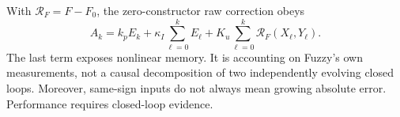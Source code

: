 With $\mathcal R_F=F-F_0$, the zero-constructor raw correction obeys
\begin{equation}
 A_k=k_pE_k+\kappa_I\sum_{\ell=0}^kE_\ell
               +K_u\sum_{\ell=0}^k\mathcal R_F(X_\ell,Y_\ell).
 \label{eq:fpd_accounting}
\end{equation}
The last term exposes nonlinear memory. It is accounting on Fuzzy's
own measurements, not a causal decomposition of two independently
evolving closed loops. Moreover, same-sign inputs do not always mean
growing absolute error. Performance requires closed-loop evidence.
